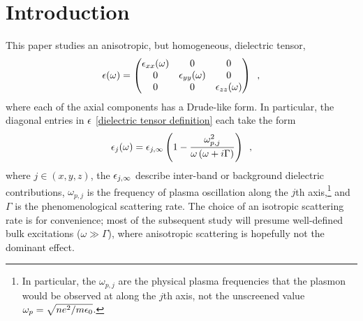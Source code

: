 \section*{Introduction}

This paper studies an anisotropic, but homogeneous, dielectric tensor,
\begin{equation}
    \label{dielectric tensor definition}
    \epsilon(\omega) = \begin{pmatrix}
    \epsilon_{xx}(\omega) & 0 & 0
    \\ 0 & \epsilon_{yy}(\omega) & 0
    \\ 0 & 0 & \epsilon_{zz}(\omega)
    \end{pmatrix}
    \,\,\,,
\end{equation}
where each of the axial components has a Drude-like form.  In particular, the diagonal entries in $\epsilon$ \eqref{dielectric tensor definition} each take the form
\begin{equation}
    \label{dielectric component Drude definition}
    \epsilon_j(\omega) = \epsilon_{j,\infty}\left( 1-\frac{\omega_{p,j}^2}{\omega\left(\omega+i\Gamma\right)}\right)\,\,\,,
\end{equation}
where $j\in(x,y,z)$, the $\epsilon_{j,\infty}$ describe inter-band or background dielectric contributions, $\omega_{p,j}$ is the frequency of plasma oscillation along the $j$th axis,\footnote{In particular, the $\omega_{p,j}$ are the physical plasma frequencies that the plasmon would be observed at along the $j$th axis, not the unscreened value $\omega_p=\sqrt{ne^2/m\epsilon_0}$.} and $\Gamma$ is the phenomenological scattering rate.  The choice of an isotropic scattering rate is for convenience; most of the subsequent study will presume well-defined bulk excitations ($\omega\gg\Gamma$), where anisotropic scattering is hopefully not the dominant effect.